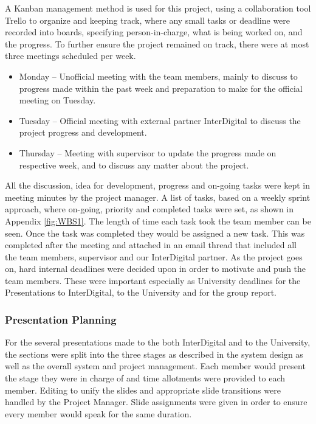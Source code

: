 A Kanban management method \cite{landau_2019} is used for this project, using a collaboration tool Trello to organize and keeping track, where any small tasks or deadline were recorded into boards, specifying person-in-charge, what is being worked on, and the progress. To further ensure the project remained on track, there were at most three meetings scheduled per week.
\begin{itemize}
    \item Monday – Unofficial meeting with the team members, mainly to discuss to progress made within the past week and preparation to make for the official meeting on Tuesday.
    \item Tuesday – Official meeting with external partner InterDigital to discuss the project progress and development.
    \item Thursday – Meeting with supervisor to update the progress made on respective week, and to discuss any matter about the project.
\end{itemize}

All the discussion, idea for development, progress and on-going tasks were kept in meeting minutes by the project manager. A list of tasks, based on a weekly sprint approach, where on-going, priority and completed tasks were set, as shown in Appendix \ref{fig:WBS1}. The length of time each task took the team member can be seen. Once the task was completed they would be assigned a new task. This was completed after the meeting and attached in an email thread that included all the team members, supervisor and our InterDigital partner. As the project goes on, hard internal deadlines were decided upon in order to motivate and push the team members. These were important especially as University deadlines for the Presentations to InterDigital, to the University and for the group report. 

\subsubsection{Presentation Planning}
For the several presentations made to the both InterDigital and to the University, the sections were split into the three stages as described in the system design as well as the overall system and project management. Each member would present the stage they were in charge of and time allotments were provided to each member. Editing to unify the slides and appropriate slide transitions were handled by the Project Manager. Slide assignments were given in order to ensure every member would speak for the same duration.

